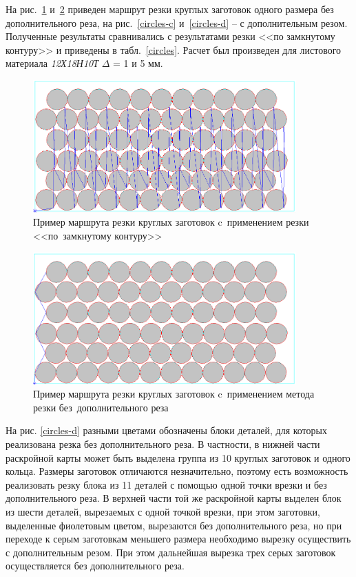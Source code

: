 \documentclass[11pt,twoside,openany]{report}
\begin{document}
На рис.~\ref{circles-a}
и~\ref{circles-b}
приведен маршрут резки
круглых заготовок одного размера без дополнительного реза,
на рис.~\ref{circles-c}
и~\ref{circles-d} -- с дополнительным резом.
Полученные результаты сравнивались с результатами
резки <<по замкнутому контуру>> и приведены в
табл.~\ref{circles}.
Расчет был произведен для листового материала
{\it 12Х18Н10Т}
$\Delta$ = 1 и 5 мм.

\begin{figure}
  \begin{center}
  \includegraphics[width=0.9\textwidth]{circles-a.png}
  \caption{
    Пример маршрута резки круглых заготовок
    c~применением резки
    <<по~замкнутому контуру>>
  }
  \label{circles-a}
  \end{center}
\end{figure}

\begin{figure}
  \begin{center}
  \includegraphics[width=0.9\textwidth]{circles-b.png}
  \caption{
    Пример маршрута резки круглых заготовок
    c~применением метода резки
    без~дополнительного реза}
  \label{circles-b}
  \end{center}
\end{figure}

На рис. \ref{circles-d}
разными цветами обозначены блоки деталей,
для которых реализована резка без дополнительного реза.
В частности, в нижней  части раскройной карты
может быть выделена
группа из 10 круглых заготовок и одного кольца.
Размеры заготовок отличаются незначительно,
поэтому есть возможность реализовать резку блока из 11 деталей с
помощью одной точки врезки и без дополнительного реза.
В  верхней части той же раскройной карты выделен блок из шести деталей,
вырезаемых с одной точкой врезки, при этом заготовки,
выделенные фиолетовым цветом, вырезаются без дополнительного реза,
но при переходе к серым заготовкам меньшего размера необходимо
вырезку осуществить с дополнительным резом.
При этом дальнейшая вырезка трех серых заготовок
осуществляется без дополнительного реза.
\end{document}
